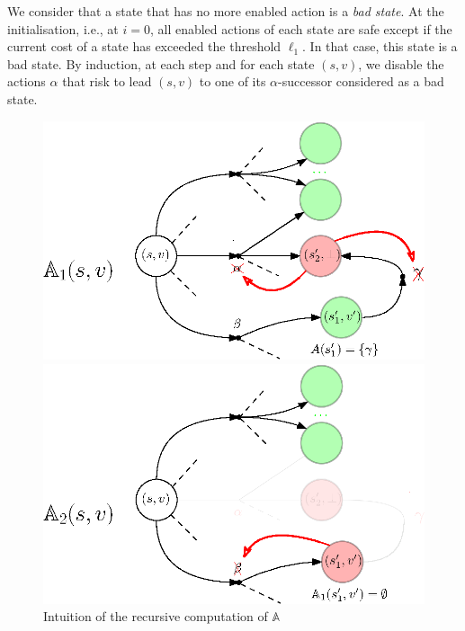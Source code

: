 We consider that a state that has no more enabled action is a \textit{bad state}.
At the initialisation, i.e., at $i=0$, all enabled actions of each state are safe except if the current cost of a state has exceeded the threshold $\ell_1$. In that case, this state is a bad state.
By induction, at each step and for each state $(s, v)$,
we disable the actions $\alpha$
that risk to lead $(s, v)$ to one of its $\alpha$-successor considered as a bad state.%
\begin{figure}[h]
  \begin{minipage}{0.5\linewidth}
    \centering
    \includegraphics[width=0.9\linewidth]{resources/attractor}
  \end{minipage}
  \begin{minipage}{0.5\linewidth}
    \centering
    \includegraphics[width=0.9\linewidth]{resources/attractor2}
  \end{minipage}
  \caption{Intuition of the recursive computation of $\mathbb{A}$}
\end{figure}

